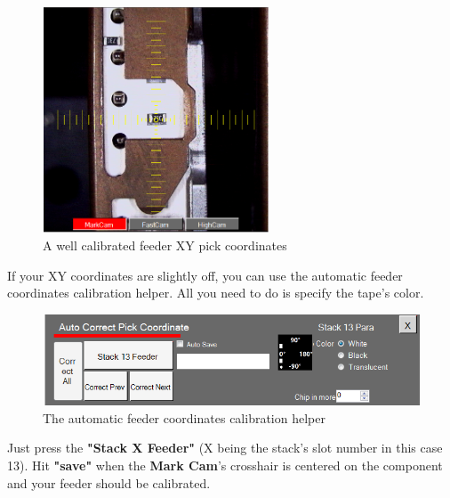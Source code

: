 \documentclass[a4paper,10pt]{report}
\begin{document}
 \begin{figure}[!htb]
 \centering
 \includegraphics[width=0.6\textwidth]{images/scrot22.png}
 \caption{A well calibrated feeder XY pick coordinates}
\end{figure}
If your XY coordinates are slightly off, you can use the automatic feeder coordinates calibration helper. All you need to do is specify the tape's color.\\

 \begin{figure}[!htb]
 \centering
 \includegraphics[width=1\textwidth]{images/scrot23.png}
 \caption{The automatic feeder coordinates calibration helper}
\end{figure}
Just press the \textbf{"Stack X Feeder"} (X being the stack's slot number in this case 13). Hit \textbf{"save"} when the \textbf{Mark Cam}'s crosshair is centered on the component and your feeder should be calibrated.
\newpage
\end{document}
